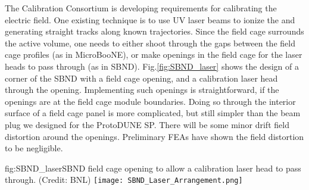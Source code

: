 The Calibration Consortium is developing requirements for calibrating the  electric field.  One existing technique is to use UV laser beams to ionize the  and generating straight tracks along known trajectories.  Since the field cage surrounds the  active volume, one needs to either shoot through the gaps between the field cage profiles (as in MicroBooNE), or make openings in the field cage for the laser heads to pass through (as in SBND).    Fig.\ref{fig:SBND_laser}  shows the design of a corner of the SBND  with a field cage opening, and a calibration laser head through the opening.  Implementing such openings is straightforward, if the openings are at the field cage module boundaries.  Doing so through the interior surface of a field cage panel is more complicated, but still simpler than the beam plug we designed for the ProtoDUNE SP.  There will be some minor drift field distortion around the openings.  Preliminary FEAs have shown the field distortion to be negligible. 

\begin{dunefigure}{fig:SBND_laser}{SBND field cage opening to allow a calibration laser head to pass through. (Credit: BNL)}
\texttt{[image: SBND\_Laser\_Arrangement.png]}
\end{dunefigure}



